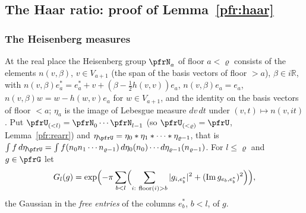 \documentclass[10pt]{amsart}
\theoremstyle{definition}
\theoremstyle{remark}
\newcommand{\R}{\mathbb R}
\newcommand{\Iml}{\operatorname{Im}}
\begin{document}
\subsection{The Haar ratio: proof of Lemma~\ref{pfr:haar}}\label{prp:ss-haar}

\subsubsection*{The Heisenberg measures}
At the real place the Heisenberg group $\pfrN_a$ of floor $a<\varrho$ consists of the elements
$n(v,\beta)$, $v\in V_{a+1}$ (the span of the basis vectors of floor $>a$), $\beta\in i\R$, with
$n(v,\beta)e_a^*=e_a^*+v+(\beta-\tfrac12h(v,v))e_a$, $n(v,\beta)e_a=e_a$, $n(v,\beta)w=w-h(w,v)e_a$ for
$w\in V_{a+1}$, and the identity on the basis vectors of floor $<a$; $\eta_a$ is the image of
Lebesgue measure $dv\,dt$ under $(v,t)\mapsto n(v,it)$. Put $\pfrU_{(<l)}=\pfrN_0\cdots\pfrN_{l-1}$
(so $\pfrU_{(<\varrho)}=\pfrU$, Lemma~\ref{pfr:rearr}) and $\eta_\pfrU=\eta_0*\eta_1*\dots*\eta_{\varrho-1}$,
that is $\int f\,d\eta_\pfrU=\int f(n_0n_1\cdots n_{\varrho-1})\,d\eta_0(n_0)\cdots d\eta_{\varrho-1}(n_{\varrho-1})$.
For $l\le\varrho$ and $g\in\pfrG$ let
\[
G_l(g)=\exp\Bigl(-\pi\sum_{b<l}\Bigl(\sum_{i:\ \text{floor}(i)>b}|g_{i,e_b^*}|^2+(\Iml g_{e_b,e_b^*})^2\Bigr)\Bigr),
\]
the Gaussian in the \emph{free entries} of the columns $e_b^*$, $b<l$, of $g$.
\end{document}
